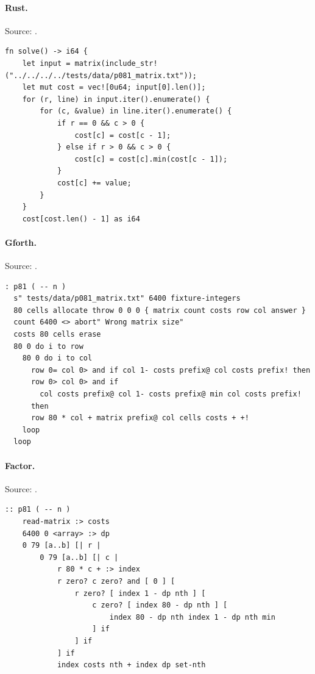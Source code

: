 \paragraph{Rust.} Source: .
\begin{lstlisting}
fn solve() -> i64 {
    let input = matrix(include_str!("../../../../tests/data/p081_matrix.txt"));
    let mut cost = vec![0u64; input[0].len()];
    for (r, line) in input.iter().enumerate() {
        for (c, &value) in line.iter().enumerate() {
            if r == 0 && c > 0 {
                cost[c] = cost[c - 1];
            } else if r > 0 && c > 0 {
                cost[c] = cost[c].min(cost[c - 1]);
            }
            cost[c] += value;
        }
    }
    cost[cost.len() - 1] as i64
\end{lstlisting}

\paragraph{Gforth.} Source: .
\begin{lstlisting}
: p81 ( -- n )
  s" tests/data/p081_matrix.txt" 6400 fixture-integers
  80 cells allocate throw 0 0 0 { matrix count costs row col answer }
  count 6400 <> abort" Wrong matrix size"
  costs 80 cells erase
  80 0 do i to row
    80 0 do i to col
      row 0= col 0> and if col 1- costs prefix@ col costs prefix! then
      row 0> col 0> and if
        col costs prefix@ col 1- costs prefix@ min col costs prefix!
      then
      row 80 * col + matrix prefix@ col cells costs + +!
    loop
  loop
\end{lstlisting}

\paragraph{Factor.} Source: .
\begin{lstlisting}
:: p81 ( -- n )
    read-matrix :> costs
    6400 0 <array> :> dp
    0 79 [a..b] [| r |
        0 79 [a..b] [| c |
            r 80 * c + :> index
            r zero? c zero? and [ 0 ] [
                r zero? [ index 1 - dp nth ] [
                    c zero? [ index 80 - dp nth ] [
                        index 80 - dp nth index 1 - dp nth min
                    ] if
                ] if
            ] if
            index costs nth + index dp set-nth
\end{lstlisting}

